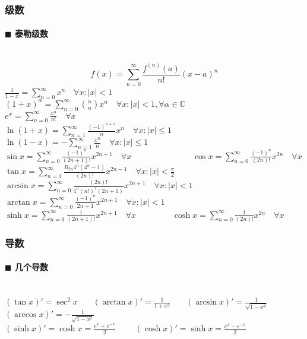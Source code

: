 \subsubsection{级数}
\paragraph{$\blacksquare$ 泰勒级数}
\noindent \\
$$f(x)=\sum _{n=0}^{\infty }{\frac {f^{(n)}(a)}{n!}}(x-a)^{n}$$
${\displaystyle {\frac {1}{1-x}}=\sum _{n=0}^{\infty }x^{n}\quad \forall x:\left|x\right|<1}$~~~~~~~~~
${\displaystyle (1+x)^{\alpha }=\sum _{n=0}^{\infty }\binom{\alpha}{n} x^{n}\quad \forall x:\left|x\right|<1,\forall \alpha \in \mathbb {C}}$\\
${\displaystyle e^{x}=\sum _{n=0}^{\infty }{\frac {x^{n}}{n!}}\quad \forall x}$\\
${\displaystyle \ln(1+x)=\sum _{n=1}^{\infty }{\frac {(-1)^{n+1}}{n}}x^{n}\quad \forall x:\left| x\right| \leq 1}$~~~~
${\displaystyle \ln(1-x)=-\sum _{n=1}^{\infty }{\frac {x^n}{n}}\quad \forall x:\left| x\right| \leq 1}$\\
${\displaystyle \sin x=\sum _{n=0}^{\infty }{\frac {(-1)^{n}}{(2n+1)!}}x^{2n+1}\quad \forall x}$~~~~~~~~~~~~~~
${\displaystyle \cos x=\sum _{n=0}^{\infty }{\frac {(-1)^{n}}{(2n)!}}x^{2n}\quad \forall x}$\\
${\displaystyle \tan x=\sum _{n=1}^{\infty }{\frac {B_{2n}4^{n}(4^{n}-1)}{(2n)!}}x^{2n-1}\quad \forall x:\left|x\right|<{\frac {\pi }{2}}}$\\
${\displaystyle \arcsin x=\sum _{n=0}^{\infty }{\frac {(2n)!}{4^{n}(n!)^{2}(2n+1)}}x^{2n+1}\quad \forall x:\left|x\right|<1}$\\
${\displaystyle \arctan x=\sum _{n=0}^{\infty }{\frac {(-1)^{n}}{2n+1}}x^{2n+1}\quad \forall x:\left|x\right|<1}$\\
${\displaystyle \sinh x=\sum _{n=0}^{\infty }{\frac {1}{(2n+1)!}}x^{2n+1}\quad \forall x}$~~~~~~~~
${\displaystyle \cosh x=\sum _{n=0}^{\infty }{\frac {1}{(2n)!}}x^{2n}\quad \forall x}$

\subsubsection{导数}
\paragraph{$\blacksquare$ 几个导数}
\noindent \\
$(\tan x)'=\sec ^2 x$~~~
$(\arctan x)'=\frac{1}{1+x^2}$~~~
$(\arcsin x)'=\frac{1}{\sqrt{1-x^2}}$~~~
$(\arccos x)'=-\frac{1}{\sqrt{1-x^2}}$\\
$(\sinh x)'=\cosh x=\frac{e^x+e^{-x}}{2}$~~~~
$(\cosh x)'=\sinh x=\frac{e^x-e^{-x}}{2}$
